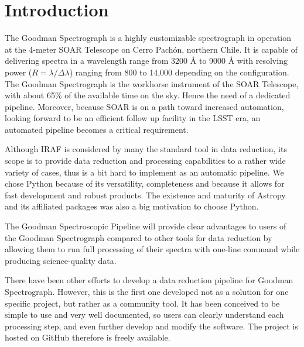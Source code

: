 \documentclass[11pt,twoside]{article}
\begin{document}
\section{Introduction}

The Goodman Spectrograph \citep{2004SPIE.5492..331C} is a highly customizable spectrograph in operation at
the 4-meter SOAR Telescope on Cerro Pach\'on, northern Chile.
It is capable of delivering spectra in a wavelength range from 3200 \AA{} to 9000 \AA{}
with resolving power ($R=\lambda/\Delta\lambda$) ranging from 800 to 14,000
depending on the configuration. The Goodman Spectrograph is the workhorse
instrument of the SOAR Telescope, with about 65\% of the available time on the sky.
Hence the need of a dedicated pipeline.
Moreover, because SOAR is on a path toward increased automation, looking forward
to be an efficient follow up facility in the LSST era, an automated pipeline
becomes a critical requirement.

Although IRAF is considered by many the standard tool
in data reduction, its scope is to provide data reduction and processing
capabilities to a rather wide variety of cases, thus is a bit hard to implement
as an automatic pipeline.  We chose Python because of its
versatility, completeness and because it allows for fast development and
robust products. The existence and maturity of Astropy and its affiliated
packages was also a big motivation to choose Python.


The Goodman Spectroscopic Pipeline will provide clear advantages to users of the
Goodman Spectrograph compared to other tools for data reduction by allowing
them to run full processing of their spectra with one-line command while producing
science-quality data.

There have been other efforts to develop a data reduction pipeline for Goodman
Spectrograph. However, this is the first one developed not as a solution for one
specific project, but rather as a community tool. It has been conceived to be
simple to use and very well documented, so users can clearly understand each
processing step, and even further develop and modify the software.
The project is hosted on GitHub therefore is freely available.
\end{document}

